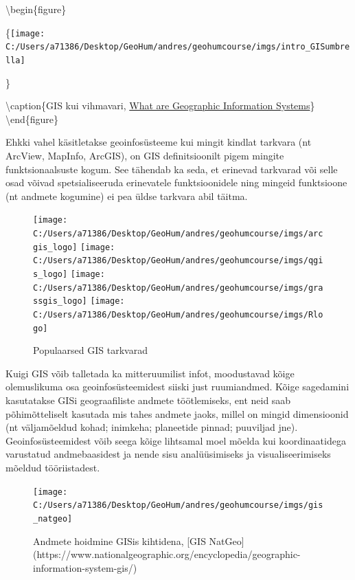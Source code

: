 \documentclass[
]{book}
\begin{document}
\textbackslash begin\{figure\}

\{\centering \texttt{[image: C:/Users/a71386/Desktop/GeoHum/andres/geohumcourse/imgs/intro\_GISumbrella]}

\}

\textbackslash caption\{GIS kui vihmavari, \href{http://spatialquerylab.com/FOSS4GAcademy/Lectures/GST101/L1/1-What_are_Geographic_Information_Systems.pdf}{What are Geographic Information Systems}\}\label{fig:gis-umbrella}
\textbackslash end\{figure\}

Ehkki vahel käsitletakse geoinfosüsteeme kui mingit kindlat tarkvara (nt ArcView, MapInfo, ArcGIS), on GIS definitsioonilt pigem mingite funktsionaalsuste kogum. See tähendab ka seda, et erinevad tarkvarad või selle osad võivad spetsialiseeruda erinevatele funktsioonidele ning mingeid funktsioone (nt andmete kogumine) ei pea üldse tarkvara abil täitma.

\begin{figure}

{\centering \texttt{[image: C:/Users/a71386/Desktop/GeoHum/andres/geohumcourse/imgs/arcgis\_logo]} \texttt{[image: C:/Users/a71386/Desktop/GeoHum/andres/geohumcourse/imgs/qgis\_logo]} \texttt{[image: C:/Users/a71386/Desktop/GeoHum/andres/geohumcourse/imgs/grassgis\_logo]} \texttt{[image: C:/Users/a71386/Desktop/GeoHum/andres/geohumcourse/imgs/Rlogo]} 

}

\caption{Populaarsed GIS tarkvarad}\label{fig:gis-tarkvarad}
\end{figure}

Kuigi GIS võib talletada ka mitteruumilist infot, moodustavad kõige olemuslikuma osa geoinfosüsteemidest siiski just ruumiandmed. Kõige sagedamini kasutatakse GISi geograafiliste andmete töötlemiseks, ent neid saab põhimõtteliselt kasutada mis tahes andmete jaoks, millel on mingid dimensioonid (nt väljamõeldud kohad; inimkeha; planeetide pinnad; puuviljad jne). Geoinfosüsteemidest võib seega kõige lihtsamal moel mõelda kui koordinaatidega varustatud andmebaasidest ja nende sisu analüüsimiseks ja visualiseerimiseks mõeldud tööriistadest.

\begin{figure}

{\centering \texttt{[image: C:/Users/a71386/Desktop/GeoHum/andres/geohumcourse/imgs/gis\_natgeo]} 

}

\caption{Andmete hoidmine GISis kihtidena, [GIS NatGeo](https://www.nationalgeographic.org/encyclopedia/geographic-information-system-gis/)}\label{fig:kihid}
\end{figure}
\end{document}
